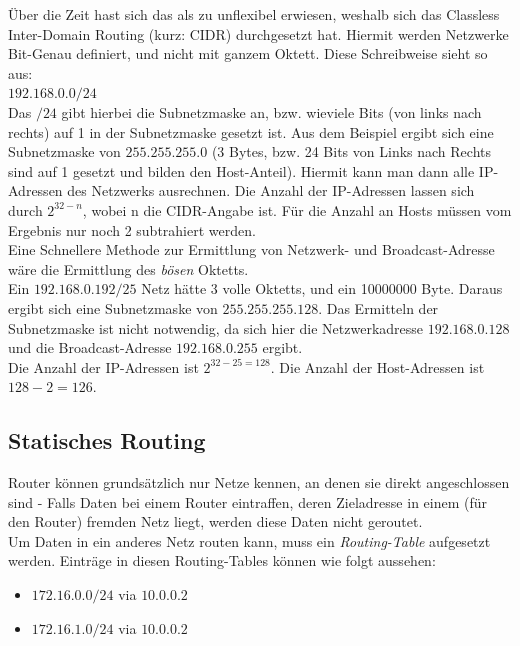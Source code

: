 \documentclass[a4paper, 12pt]{report}
\begin{document}
\begin{multicols}{2}
Über die Zeit hast sich das als zu unflexibel erwiesen, weshalb sich das
Classless Inter-Domain Routing (kurz: CIDR) durchgesetzt hat. Hiermit werden
Netzwerke Bit-Genau definiert, und nicht mit ganzem Oktett. Diese Schreibweise
sieht so aus: \\

$192.168.0.0/24$ \\

Das $/24$ gibt hierbei die Subnetzmaske an, bzw. wieviele Bits (von links nach
rechts) auf 1 in der Subnetzmaske gesetzt ist. Aus dem Beispiel ergibt sich eine
Subnetzmaske von $255.255.255.0$ (3 Bytes, bzw. 24 Bits von Links nach Rechts
sind auf 1 gesetzt und bilden den Host-Anteil). Hiermit kann man dann alle
IP-Adressen des Netzwerks ausrechnen. Die Anzahl der IP-Adressen lassen sich
durch $2^{32 - n}$, wobei n die CIDR-Angabe ist. Für die Anzahl an Hosts müssen
vom Ergebnis nur noch 2 subtrahiert werden. \\

Eine Schnellere Methode zur Ermittlung von Netzwerk- und Broadcast-Adresse wäre
die Ermittlung des \emph{bösen} Oktetts. \\

Ein $192.168.0.192/25$ Netz hätte 3 volle Oktetts, und ein 10000000 Byte. Daraus
ergibt sich eine Subnetzmaske von $255.255.255.128$. Das Ermitteln der
Subnetzmaske ist nicht notwendig, da sich hier die Netzwerkadresse
$192.168.0.128$ und die Broadcast-Adresse $192.168.0.255$ ergibt. \\

Die Anzahl der IP-Adressen ist $2^{32-25 = 128}$. Die Anzahl der Host-Adressen
ist $128 - 2 = 126$.

\subsection{Statisches Routing}

Router können grundsätzlich nur Netze kennen, an denen sie direkt angeschlossen
sind - Falls Daten bei einem Router eintraffen, deren Zieladresse in einem (für
den Router) fremden Netz liegt, werden diese Daten nicht geroutet. \\

Um Daten in ein anderes Netz routen kann, muss ein \emph{Routing-Table}
aufgesetzt werden. Einträge in diesen Routing-Tables können wie folgt aussehen:

\begin{itemize}
    \item $172.16.0.0/24$ via $10.0.0.2$
    \item $172.16.1.0/24$ via $10.0.0.2$
\end{itemize}


\end{multicols}
\end{document}
